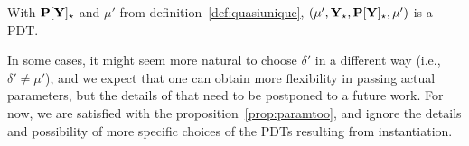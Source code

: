 %
\begin{proposition}\label{prop:paramtoo}
With $\thr{P[Y]_\cons}$ and $\mu'$ from definition~\ref{def:quasiunique}, 
$\pdtsp{\mu'}{\mu'}{\thr{Y_\cons}}{\thr{P[Y]_\cons}}$ is a PDT.
\end{proposition} 
%
In some cases, it might seem more natural to choose $\delta'$ in a
different way (i.e., $\delta'\not=\mu'$), and
we expect that one can obtain more flexibility in passing actual
parameters, but the details of that need to be postponed to a future work. 
For now, we are satisfied with the proposition~\ref{prop:paramtoo}, and ignore the details
and possibility of more specific choices of the PDTs resulting from instantiation.


